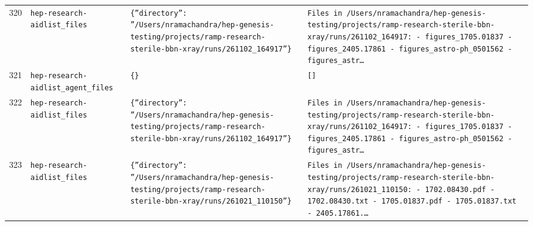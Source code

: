 \documentclass[11pt,a4paper]{article}
\begin{document}
\begin{longtable}{@{}p{}p{}p{}p{}@{}}
320 & \texttt{hep-research-aid}\newline\texttt{list\_\allowbreak{}files} & \texttt{\{''directory'':\allowbreak{} ''/\allowbreak{}Users/\allowbreak{}nramachandra/\allowbreak{}hep-genesis-testing/\allowbreak{}projects/\allowbreak{}ramp-research-sterile-bbn-xray/\allowbreak{}runs/\allowbreak{}261102\_\allowbreak{}164917''\}\allowbreak{}} & \texttt{Files in /\allowbreak{}Users/\allowbreak{}nramachandra/\allowbreak{}hep-genesis-testing/\allowbreak{}projects/\allowbreak{}ramp-research-sterile-bbn-xray/\allowbreak{}runs/\allowbreak{}261102\_\allowbreak{}164917:\allowbreak{}   - figures\_\allowbreak{}1705.01837   - figures\_\allowbreak{}2405.17861   - figures\_\allowbreak{}astro-ph\_\allowbreak{}0501562   - figures\_\allowbreak{}astr\ldots{}\allowbreak{}} \\
321 & \texttt{hep-research-aid}\newline\texttt{list\_\allowbreak{}agent\_\allowbreak{}files} & \texttt{\{\}\allowbreak{}} & \texttt{[]\allowbreak{}} \\
322 & \texttt{hep-research-aid}\newline\texttt{list\_\allowbreak{}files} & \texttt{\{''directory'':\allowbreak{} ''/\allowbreak{}Users/\allowbreak{}nramachandra/\allowbreak{}hep-genesis-testing/\allowbreak{}projects/\allowbreak{}ramp-research-sterile-bbn-xray/\allowbreak{}runs/\allowbreak{}261102\_\allowbreak{}164917''\}\allowbreak{}} & \texttt{Files in /\allowbreak{}Users/\allowbreak{}nramachandra/\allowbreak{}hep-genesis-testing/\allowbreak{}projects/\allowbreak{}ramp-research-sterile-bbn-xray/\allowbreak{}runs/\allowbreak{}261102\_\allowbreak{}164917:\allowbreak{}   - figures\_\allowbreak{}1705.01837   - figures\_\allowbreak{}2405.17861   - figures\_\allowbreak{}astro-ph\_\allowbreak{}0501562   - figures\_\allowbreak{}astr\ldots{}\allowbreak{}} \\
323 & \texttt{hep-research-aid}\newline\texttt{list\_\allowbreak{}files} & \texttt{\{''directory'':\allowbreak{} ''/\allowbreak{}Users/\allowbreak{}nramachandra/\allowbreak{}hep-genesis-testing/\allowbreak{}projects/\allowbreak{}ramp-research-sterile-bbn-xray/\allowbreak{}runs/\allowbreak{}261021\_\allowbreak{}110150''\}\allowbreak{}} & \texttt{Files in /\allowbreak{}Users/\allowbreak{}nramachandra/\allowbreak{}hep-genesis-testing/\allowbreak{}projects/\allowbreak{}ramp-research-sterile-bbn-xray/\allowbreak{}runs/\allowbreak{}261021\_\allowbreak{}110150:\allowbreak{}   - 1702.08430.pdf   - 1702.08430.txt   - 1705.01837.pdf   - 1705.01837.txt   - 2405.17861.\ldots{}\allowbreak{}} \\

\end{longtable}
\end{document}
